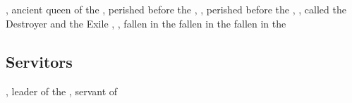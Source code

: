 


\section[Dragons]{}
\begin{dramatispersonae}
  \dramitem[Tiamat]{\TyarithXserasshana}{\dragon}{\female}, 
    ancient queen of the ,
      perished before the \secondbanewar{}
  \dramitem[Nexagglachel]{\RaemythNexagglachel}{\dragon}{\male}, 
      , 
      perished before the \secondbanewar{}
  \dramitem[Ishnaruchaefir]{\QuessanthIshnaruchaefir}
    {\dragon}{\male}, 
      ,
      called the Destroyer and the Exile
  \dramitem[Secherdamon]{\IrocasSecherdamon}{\dragon}{\male}, 
  \dramitem[Nzessuacrith]{\CryocasNzessuacrith}{\dragon}{\female}
  , 
    fallen in the 
    fallen in the 
    fallen in the 
  \dramitem[Vaccashyth]{\Vaccashyth}{\dragon}{\female}
  \dramitem[Dasvedshiracht]{\Dasvedshiracht}{\dragon}{\male}
\end{dramatispersonae}

\subsection{Servitors}
\begin{dramatispersonae}
  \dramitem[Psyrex]{\LocarPsyrex}{\scatha}{\male}, 
    leader of the 
  \dramitem[Criseis]{\Criseis}{\scatha}{\female}, 
    servant of \Ishnaruchaefir
\end{dramatispersonae}




